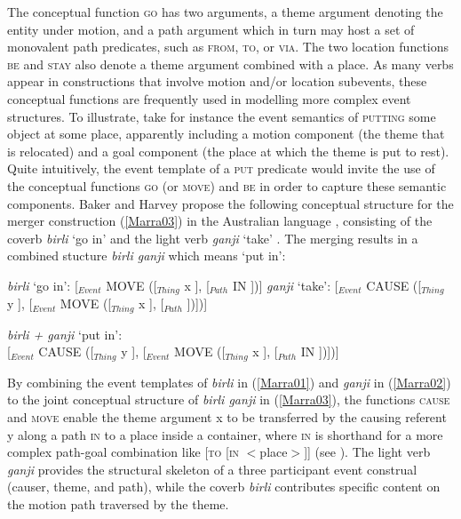\smallskip
{\scriptsize
\begin{avm}
\end{avm}
}

\bigskip
The conceptual function \textsc{go} has two arguments, a theme argument denoting the entity under motion, and a path argument which in turn may host a set of monovalent path predicates, such as \textsc{from}, \textsc{to}, or \textsc{via}. The two location functions \textsc{be} and \textsc{stay} also denote a theme argument combined with a place. As many verbs appear in constructions that involve motion and/or location subevents, these conceptual functions are frequently used in modelling more complex event structures. To illustrate, take for instance the event semantics of \textsc{putting} some object at some place, apparently including a motion component (the theme that is relocated) and a goal component (the place at which the theme is put to rest). Quite intuitively, the event template of a \textsc{put} predicate would invite the use of the conceptual functions \textsc{go} (or \textsc{move}) and \textsc{be} in order to capture these semantic components. Baker and Harvey propose the following conceptual structure for the merger construction (\ref{Marra03}) in the Australian language , consisting of the coverb \textit{birli} `go in' and the light verb \textit{ganji} `take' \citep[24f.]{baker2010complex}. The merging results in a combined stucture \textit{birli ganji} which means `put in':

\ea \label{Marra01}
\textit{birli} `go in': {\small[$_{Event}$ MOVE ([$_{Thing}$ x ], [$_{Path}$ IN ])]}
\z
\ea \label{Marra02}
\textit{ganji} `take': {\small[$_{Event}$ CAUSE ([$_{Thing}$ y ], [$_{Event}$ MOVE ([$_{Thing}$ x ], [$_{Path}$ ])])]}
\z

\ea \label{Marra03}
\textit{birli + ganji} `put in': \\
{\small[$_{Event}$ CAUSE ([$_{Thing}$ y ], [$_{Event}$ MOVE ([$_{Thing}$ x ], [$_{Path}$ IN ])])]}
\z

By combining the event templates of \textit{birli} in (\ref{Marra01}) and \textit{ganji} in (\ref{Marra02}) to the joint conceptual structure of \textit{birli ganji} in (\ref{Marra03}), the functions \textsc{cause} and \textsc{move} enable the theme argument x to be transferred by the causing referent y along a path \textsc{in} to a place inside a container, where \textsc{in} is shorthand for a more complex path-goal combination like [\textsc{to} [\textsc{in} $<$place$>$]] (see \citealt[45]{Jackendoff1990}). The light verb \textit{ganji} provides the structural skeleton of a three participant event construal (causer, theme, and path), while the coverb \textit{birli} contributes specific content on the motion path traversed by the theme. 

